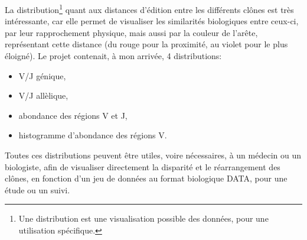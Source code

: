 \documentclass[12pt]{report}
\begin{document}
\begin{spacing}{1.2}
La distribution\footnote{Une distribution est une visualisation possible des données, pour une utilisation spécifique.} quant aux distances d'édition entre les différents clônes est très intéressante, car elle permet de visualiser les similarités biologiques entre ceux-ci, par leur rapprochement physique, mais aussi par la couleur de l'arête, représentant cette distance (du rouge pour la proximité, au violet pour le plus éloigné).
\newline
Le projet contenait, à mon arrivée, 4 distributions:
\begin{itemize}
\item V/J génique,
\item V/J allèlique,
\item abondance des régions V et J,
\item histogramme d'abondance des régions V.
\end{itemize}
Toutes ces distributions peuvent être utiles, voire nécessaires, à un médecin ou un biologiste, afin de visualiser directement la disparité et le réarrangement des clônes, en fonction d'un jeu de données au format biologique DATA, pour une étude ou un suivi.


\end{spacing}
\end{document}
